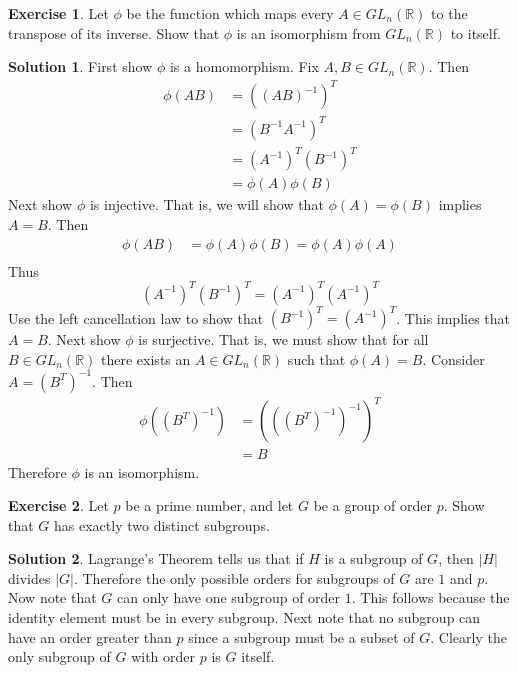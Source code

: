\documentclass[12pt]{article}
\theoremstyle{definition}
\newtheorem{exercise}{Exercise}
\theoremstyle{definition}
\newtheorem{solution}{Solution}
\begin{document}
\begin{exercise}
Let $\phi$ be the function which maps every $A \in GL_n(\mathbb{R})$ to the transpose of its inverse. Show that $\phi$ is an isomorphism from $GL_n(\mathbb{R})$ to itself.
\end{exercise}
\begin{solution}
First show $\phi$ is a homomorphism. Fix $A, B \in GL_n(\mathbb{R})$. Then
\begin{align*}
\phi(AB) &= ((AB)^{-1})^T \\
&= (B^{-1}A^{-1})^T \\
&= (A^{-1})^T (B^{-1})^T \\
&= \phi(A)\phi(B)
\end{align*}
Next show $\phi$ is injective. That is, we will show that $\phi(A) = \phi(B)$ implies $A = B$. Then
\begin{align*}
\phi(AB) &= \phi(A) \phi(B) = \phi(A) \phi(A) \\
\end{align*}
Thus
\begin{equation}
(A^{-1})^T (B^{-1})^T = (A^{-1})^T (A^{-1})^T 
\end{equation}
Use the left cancellation law to show that $(B^{-1})^T = (A^{-1})^T$. This implies that $A = B$. Next show $\phi$ is surjective. That is, we must show that for all $B \in GL_n(\mathbb{R})$ there exists an $A \in GL_n(\mathbb{R})$ such that $\phi(A) = B$. Consider $A = (B^T)^{-1}$. Then
\begin{align}
\phi((B^T)^{-1}) &= (((B^T)^{-1})^{-1})^T \\
&= B
\end{align}
Therefore $\phi$ is an isomorphism.
\end{solution}

\begin{exercise}
Let $p$ be a prime number, and let $G$ be a group of order $p$. Show that $G$ has exactly two distinct subgroups. 
\end{exercise}
\begin{solution}
Lagrange's Theorem tells us that if $H$ is a subgroup of $G$, then $|H|$ divides $|G|$. Therefore the only possible orders for subgroups of $G$ are $1$ and $p$. Now note that $G$ can only have one subgroup of order $1$. This follows because the identity element must be in every subgroup. Next note that no subgroup can have an order greater than $p$ since a subgroup must be a subset of $G$. Clearly the only subgroup of $G$ with order $p$ is $G$ itself.  
\end{solution}
\end{document}
